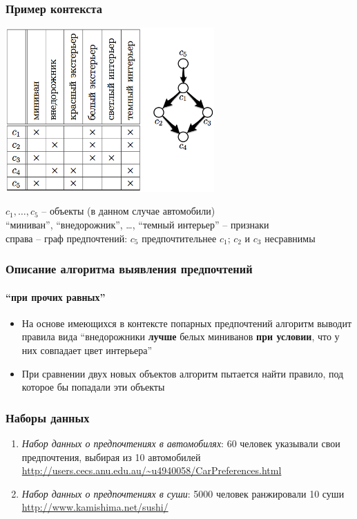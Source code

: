 \documentclass[xcolor=table]{beamer}
\theoremstyle{definition}
\begin{document}
	\begin{frame}
		\frametitle{Пример контекста}
		\begin{center}
		\includegraphics[width=80mm]{./images/context.png}
		\end{center}
		\vspace{-1.5ex}
		 $c_1, \dotsc, c_5$ – объекты (в данном случае автомобили) \\
		 ``миниван'', ``внедорожник'', \dots, ``темный интерьер'' – признаки \\
		 \vspace{1ex}
		 справа – граф предпочтений: $c_5$ предпочтительнее $c_1$; $c_2$ и $c_3$ несравнимы
	\end{frame}
	
	\begin{frame}
		\frametitle{Описание алгоритма выявления предпочтений}
		\framesubtitle{\enquote{при прочих равных}}
		
		\begin{itemize}
			\item На основе имеющихся в контексте попарных предпочтений алгоритм выводит правила вида ``внедорожники \textbf{лучше} белых миниванов \textbf{при условии}, что у них совпадает цвет интерьера''
			\item При сравнении двух новых объектов алгоритм пытается найти правило, под которое бы попадали эти объекты
		\end{itemize}
		
	\end{frame}
	
	\begin{frame}
		\frametitle{Наборы данных}
		\begin{enumerate}
			\item \emph{Набор данных о предпочтениях в автомобилях}: 60 человек указывали свои предпочтения, выбирая из 10 автомобилей \cite{dataset:Abbasnejad:2013} \\
			\url{http://users.cecs.anu.edu.au/~u4940058/CarPreferences.html}
			\vspace{1em}
			\item \emph{Набор данных о предпочтениях в суши}: 5000 человек ранжировали 10 суши \cite{Kamishima:2003}
			\url{http://www.kamishima.net/sushi/}
		\end{enumerate}
	\end{frame}
	
\end{document}
